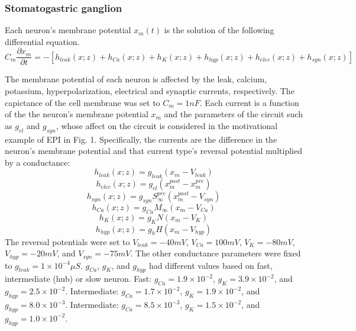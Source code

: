 \documentclass[11pt]{article}
\begin{document}
\subsubsection{Stomatogastric ganglion}\label{methods_STG}
Each neuron's membrane potential $x_m(t)$ is the solution of the following differential equation.
\begin{equation} C_m \frac{\partial x_m}{\partial t} = - \left[ h_{leak}(x; z) + h_{Ca}(x; z) + h_K(x; z) + h_{hyp}(x; z) + h_{elec}(x; z) + h_{syn}(x; z)\right] 
\end{equation} 

The membrane potential of each neuron is affected by the leak, calcium, potassium, hyperpolarization,
electrical and synaptic currents, respectively.  The capictance of the cell membrane was set to $C_m = 1nF$. Each current is a function of the the neuron's membrane potential $x_m$ and the parameters of the circuit such as  $g_{el}$ and $g_{syn}$, whose affect on the circuit is considered in the motivational example of EPI in Fig. 1.  Specifically, the currents are the difference in the neuron's membrane potential and that current type's reversal potential multiplied by a conductance:
\begin{equation}  h_{leak}(x; z) = g_{leak} (x_m - V_{leak}) 
\end{equation} 
\begin{equation}  h_{elec}(x; z) = g_{el} (x_m^{post} - x_m^{pre})
\end{equation} 
\begin{equation}  h_{syn}(x; z) = g_{syn} S_\infty^{pre} (x_m^{post} - V_{syn}) \end{equation} 
\begin{equation}  h_{Ca}(x; z) = g_{Ca} M_\infty (x_m - V_{Ca}) 
\end{equation} 
\begin{equation}  h_K(x; z) = g_K N (x_m - V_K) 
\end{equation} 
\begin{equation}  h_{hyp}(x; z) = g_h H(x_m - V_{hyp})
\end{equation} 
The reversal potentials were set to $V_{leak} = -40mV$, $V_{Ca} = 100mV$, $V_K = -80mV$, $V_{hyp} = -20mV$, and $V_{syn} = -75mV$.  The other conductance parameters were fixed to $g_{leak} = 1 \times 10^{-4} \mu S$. $g_{Ca}$, $g_{K}$, and $g_{hyp}$ had different values based on fast, intermediate (hub) or slow neuron.  Fast: $g_{Ca} = 1.9 \times 10^{-2}$, $ g_K = 3.9 \times 10^{-2} $, and $ g_{hyp} = 2.5 \times 10^{-2} $.  Intermediate: $g_{Ca} = 1.7 \times 10^{-2}$, $ g_K = 1.9 \times 10^{-2} $, and $ g_{hyp} = 8.0 \times 10^{-3} $.  Intermediate: $g_{Ca} = 8.5 \times 10^{-3}$, $ g_K = 1.5 \times 10^{-2} $, and $ g_{hyp} = 1.0 \times 10^{-2} $.
\end{document}
